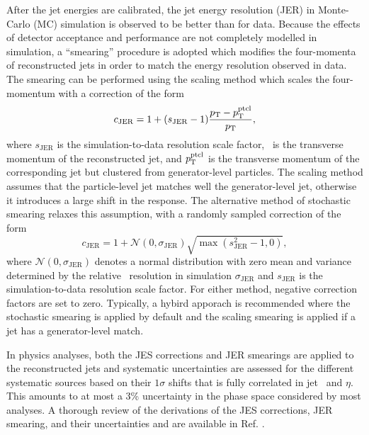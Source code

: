 After the jet energies are calibrated, the jet energy resolution (JER) in Monte-Carlo (MC) simulation is observed to be better than for data. Because the effects of detector acceptance and performance are not completely modelled in simulation, a ``smearing'' procedure is adopted which modifies the four-momenta of reconstructed jets in order to match the energy resolution observed in data. The smearing can be performed using the scaling method which scales the four-momentum with a correction of the form
\begin{equation}
  c_{\mathrm{JER}} = 1 + (s_{\mathrm{JER}} - 1) \frac{\pT - \pT^{\mathrm{ptcl}}}{\pT},
  \label{eq:smearing_scale}
\end{equation}
where $s_{\mathrm{JER}}$ is the simulation-to-data resolution scale factor, \pT\ is the transverse momentum of the reconstructed jet, and $p_{\mathrm{T}}^{\mathrm{ptcl}}$ is the transverse momentum of the corresponding jet but clustered from generator-level particles. The scaling method assumes that the particle-level jet matches well the generator-level jet, otherwise it introduces a large shift in the response. The alternative method of stochastic smearing relaxes this assumption, with a randomly sampled correction of the form
\begin{equation}
  c_{\mathrm{JER}} = 1 + \mathcal{N}\left( 0, \sigma_{\mathrm{JER}} \right) \sqrt{\max \left( s_{\mathrm{JER}}^{2} - 1, 0 \right)},
  \label{eq:smearing_stochastic}
\end{equation}
where $\mathcal{N}\left( 0, \sigma_{\mathrm{JER}} \right)$ denotes a normal distribution with zero mean and variance determined by the relative \pT\ resolution in simulation $\sigma_{\mathrm{JER}}$ and $s_{\mathrm{JER}}$ is the simulation-to-data resolution scale factor. For either method, negative correction factors are set to zero. Typically, a hybird apporach is recommended where the stochastic smearing is applied by default and the scaling smearing is applied if a jet has a generator-level match.

In physics analyses, both the JES corrections and JER smearings are applied to the reconstructed jets and systematic uncertainties are assessed for the different systematic sources based on their $1\sigma$ shifts that is fully correlated in jet \pT\ and $\eta$. This amounts to at most a 3\% uncertainty in the phase space considered by most analyses. A thorough review of the derivations of the JES corrections, JER smearing, and their uncertainties and are available in Ref. \cite{CMSJES}.

